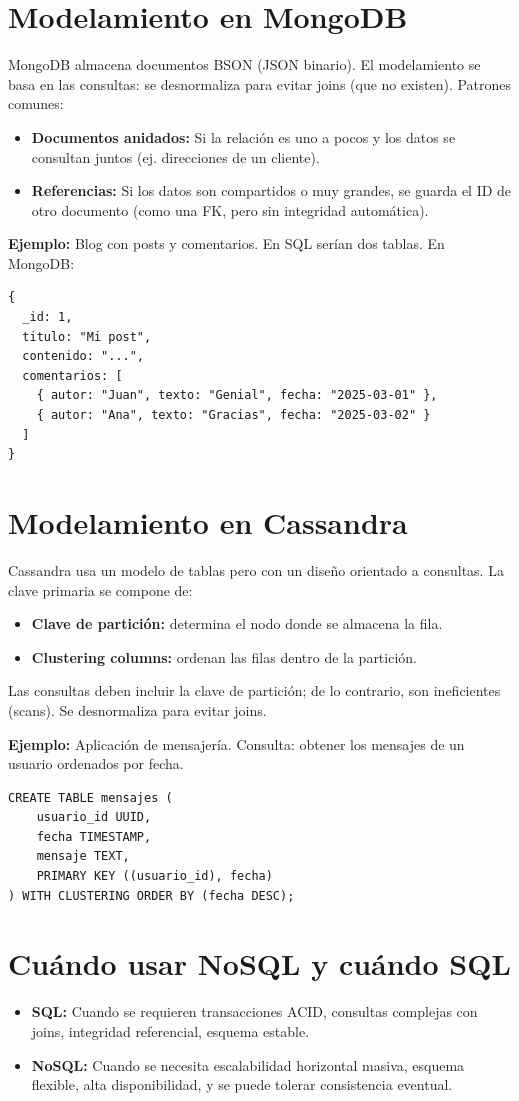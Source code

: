 \documentclass[12pt,a4paper,openany,oneside]{book}
\begin{document}
\section{Modelamiento en MongoDB}
MongoDB almacena documentos BSON (JSON binario). El modelamiento se basa en las consultas: se desnormaliza para evitar joins (que no existen). Patrones comunes:
\begin{itemize}
    \item \textbf{Documentos anidados:} Si la relación es uno a pocos y los datos se consultan juntos (ej. direcciones de un cliente).
    \item \textbf{Referencias:} Si los datos son compartidos o muy grandes, se guarda el ID de otro documento (como una FK, pero sin integridad automática).
\end{itemize}

\textbf{Ejemplo:} Blog con posts y comentarios. En SQL serían dos tablas. En MongoDB:
\begin{lstlisting}
{
  _id: 1,
  titulo: "Mi post",
  contenido: "...",
  comentarios: [
    { autor: "Juan", texto: "Genial", fecha: "2025-03-01" },
    { autor: "Ana", texto: "Gracias", fecha: "2025-03-02" }
  ]
}
\end{lstlisting}

\section{Modelamiento en Cassandra}
Cassandra usa un modelo de tablas pero con un diseño orientado a consultas. La clave primaria se compone de:
\begin{itemize}
    \item \textbf{Clave de partición:} determina el nodo donde se almacena la fila.
    \item \textbf{Clustering columns:} ordenan las filas dentro de la partición.
\end{itemize}
Las consultas deben incluir la clave de partición; de lo contrario, son ineficientes (scans). Se desnormaliza para evitar joins.

\textbf{Ejemplo:} Aplicación de mensajería. Consulta: obtener los mensajes de un usuario ordenados por fecha.
\begin{lstlisting}
CREATE TABLE mensajes (
    usuario_id UUID,
    fecha TIMESTAMP,
    mensaje TEXT,
    PRIMARY KEY ((usuario_id), fecha)
) WITH CLUSTERING ORDER BY (fecha DESC);
\end{lstlisting}

\section{Cuándo usar NoSQL y cuándo SQL}
\begin{itemize}
    \item \textbf{SQL:} Cuando se requieren transacciones ACID, consultas complejas con joins, integridad referencial, esquema estable.
    \item \textbf{NoSQL:} Cuando se necesita escalabilidad horizontal masiva, esquema flexible, alta disponibilidad, y se puede tolerar consistencia eventual.
\end{itemize}
\end{document}
